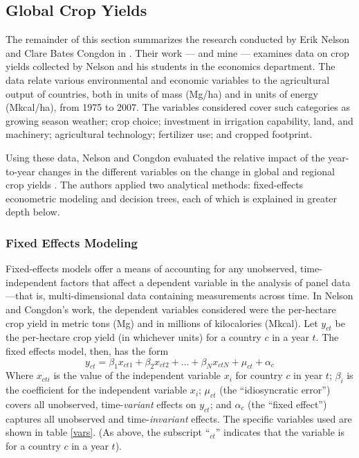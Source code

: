 \documentclass[12pt,twoside]{article}
\begin{document}
\subsection{Global Crop Yields}

The remainder of this section summarizes the research conducted by Erik Nelson and Clare Bates Congdon in \cite{nelson_measuring_2016}. Their work --- and mine --- examines data on crop yields collected by Nelson and his students in the economics department. The data relate various environmental and economic variables to the agricultural output of countries, both in units of mass (Mg/ha) and in units of energy (Mkcal/ha), from 1975 to 2007. The variables considered cover such categories as growing season weather; crop choice; investment in irrigation capability, land, and machinery; agricultural technology; fertilizer use; and cropped footprint. 

Using these data, Nelson and Congdon evaluated the relative impact of the year-to-year changes in the different variables on the change in global and regional crop yields \cite{nelson_measuring_2016}. The authors applied two analytical methods: fixed-effects econometric modeling and decision trees, each of which is explained in greater depth below.


\subsubsection{Fixed Effects Modeling}

Fixed-effects models offer a means of accounting for any unobserved, time-independent factors that affect a dependent variable in the analysis of panel data---that is, multi-dimensional data containing measurements across time. In Nelson and Congdon's work, the dependent variables considered were the per-hectare crop yield in metric tons (Mg) and in millions of kilocalories (Mkcal). Let $y_{ct}$ be the per-hectare crop yield (in whichever units) for a country $c$ in a year $t$. The fixed effects model, then, has the form
$$y_{ct} = \beta_1x_{ct1} + \beta_2x_{ct2} + \ldots + \beta_Nx_{ctN} + \mu_{ct} + \alpha_c$$
Where $x_{cti}$ is the value of the independent variable $x_i$ for country $c$ in year $t$; $\beta_i$ is the coefficient for the independent variable $x_i$; $\mu_{ct}$ (the ``idiosyncratic error'') covers all unobserved, time-\emph{variant} effects  on $y_{ct}$; and $\alpha_c$ (the ``fixed effect'') captures all unobserved and time-\emph{invariant} effects.
The specific variables used are shown in table \ref{vars}. (As above, the subscript ``$_{ct}$'' indicates that the variable is for a country $c$ in a year $t$).
\end{document}
